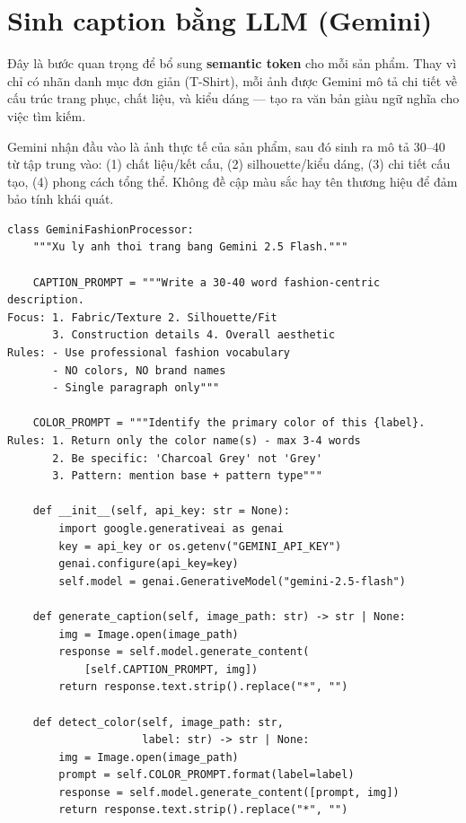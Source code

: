 \documentclass[12pt,a4paper]{report}
\begin{document}
\section{Sinh caption bằng LLM (Gemini)}

Đây là bước quan trọng để bổ sung \textbf{semantic token} cho mỗi sản phẩm. Thay vì chỉ có nhãn danh mục đơn giản (T-Shirt), mỗi ảnh được Gemini mô tả chi tiết về cấu trúc trang phục, chất liệu, và kiểu dáng --- tạo ra văn bản giàu ngữ nghĩa cho việc tìm kiếm.

\begin{tcolorbox}[title=Phương pháp: Multimodal Caption Generation]
Gemini nhận đầu vào là ảnh thực tế của sản phẩm, sau đó sinh ra mô tả 30--40 từ tập trung vào: (1) chất liệu/kết cấu, (2) silhouette/kiểu dáng, (3) chi tiết cấu tạo, (4) phong cách tổng thể. Không đề cập màu sắc hay tên thương hiệu để đảm bảo tính khái quát.
\end{tcolorbox}

\begin{lstlisting}[caption={Sinh caption thời trang bằng Gemini --- processing\_data.py}]
class GeminiFashionProcessor:
    """Xu ly anh thoi trang bang Gemini 2.5 Flash."""

    CAPTION_PROMPT = """Write a 30-40 word fashion-centric description.
Focus: 1. Fabric/Texture 2. Silhouette/Fit
       3. Construction details 4. Overall aesthetic
Rules: - Use professional fashion vocabulary
       - NO colors, NO brand names
       - Single paragraph only"""

    COLOR_PROMPT = """Identify the primary color of this {label}.
Rules: 1. Return only the color name(s) - max 3-4 words
       2. Be specific: 'Charcoal Grey' not 'Grey'
       3. Pattern: mention base + pattern type"""

    def __init__(self, api_key: str = None):
        import google.generativeai as genai
        key = api_key or os.getenv("GEMINI_API_KEY")
        genai.configure(api_key=key)
        self.model = genai.GenerativeModel("gemini-2.5-flash")

    def generate_caption(self, image_path: str) -> str | None:
        img = Image.open(image_path)
        response = self.model.generate_content(
            [self.CAPTION_PROMPT, img])
        return response.text.strip().replace("*", "")

    def detect_color(self, image_path: str,
                     label: str) -> str | None:
        img = Image.open(image_path)
        prompt = self.COLOR_PROMPT.format(label=label)
        response = self.model.generate_content([prompt, img])
        return response.text.strip().replace("*", "")
\end{lstlisting}
\end{document}
